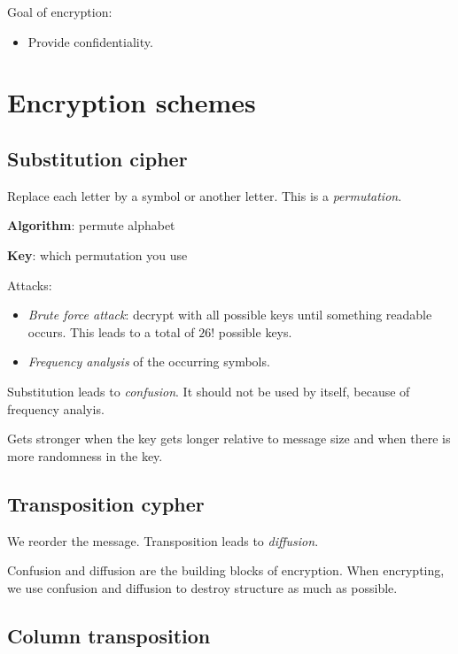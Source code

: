 \documentclass[language=english,number=]{homework}
\author{Sophie van den Eerenbeemt\\0954445}
\date{\today}
\begin{document}
\maketitlepage

\tableofcontents
\newpage

Goal of encryption:
\begin{itemize}
\item Provide confidentiality.
\end{itemize}

\section{Encryption schemes}

\subsection{Substitution cipher}

Replace each letter by a symbol or another letter.
This is a \textit{permutation}.

\textbf{Algorithm}: permute alphabet

\textbf{Key}: which permutation you use

Attacks:
\begin{itemize}
\item \textit{Brute force attack}: decrypt with all possible keys until something readable occurs.
This leads to a total of $26!$ possible keys.
\item \textit{Frequency analysis} of the occurring symbols.
\end{itemize}

Substitution leads to \textit{confusion}.
It should not be used by itself, because of frequency analyis.

Gets stronger when the key gets longer relative to message size and when there is more randomness in the key.

\subsection{Transposition cypher}

We reorder the message.
Transposition leads to \textit{diffusion}.

Confusion and diffusion are the building blocks of encryption.
When encrypting, we use confusion and diffusion to destroy structure as much as possible.

\subsection{Column transposition}
\end{document}
